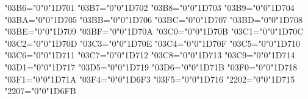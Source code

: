 {    \Umathcode"03B6="0"0"1D701%
    \Umathcode"03B7="0"0"1D702%
    \Umathcode"03B8="0"0"1D703%
    \Umathcode"03B9="0"0"1D704%
    \Umathcode"03BA="0"0"1D705%
    \Umathcode"03BB="0"0"1D706%
    \Umathcode"03BC="0"0"1D707%
    \Umathcode"03BD="0"0"1D708%
    \Umathcode"03BE="0"0"1D709%
    \Umathcode"03BF="0"0"1D70A%
    \Umathcode"03C0="0"0"1D70B%
    \Umathcode"03C1="0"0"1D70C%
    \Umathcode"03C2="0"0"1D70D%
    \Umathcode"03C3="0"0"1D70E%
    \Umathcode"03C4="0"0"1D70F%
    \Umathcode"03C5="0"0"1D710%
    \Umathcode"03C6="0"0"1D711%
    \Umathcode"03C7="0"0"1D712%
    \Umathcode"03C8="0"0"1D713%
    \Umathcode"03C9="0"0"1D714%
    \Umathcode"03D1="0"0"1D717%
    \Umathcode"03D5="0"0"1D719%
    \Umathcode"03D6="0"0"1D71B%
    \Umathcode"03F0="0"0"1D718%
    \Umathcode"03F1="0"0"1D71A%
    \Umathcode"03F4="0"0"1D6F3%
    \Umathcode"03F5="0"0"1D716%
    \Umathcode"2202="0"0"1D715%
    \Umathcode"2207="0"0"1D6FB%
    \relax
}

\everymathsl {%
    \the\everymathit
}


